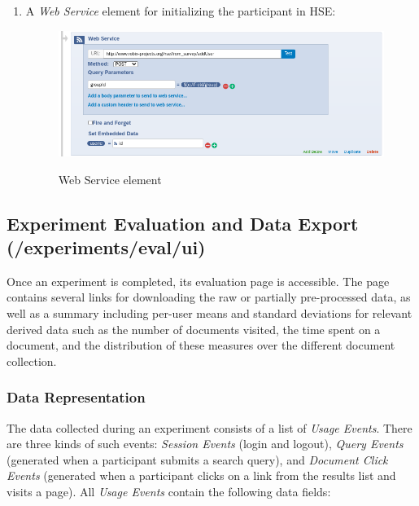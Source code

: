\documentclass[a4paper]{usiinfbachelorproject}
\begin{document}
\begin{appendices}
\begin{enumerate}
        \item
            A \emph{Web Service} element for initializing the participant in HSE:

            \begin{figure} [h]
            \centering
            \includegraphics[width=.9\textwidth]{figures/qflow5}
            \label{fig:qflow5} 
            \caption[]{Web Service element}
            \end{figure}

        \end{enumerate}

        \newpage


        \subsection{Experiment Evaluation and Data Export \small{(/experiments/eval/ui)}}

        Once an experiment is completed, its evaluation page is accessible. The page contains several links for downloading the raw or
        partially pre-processed data, as well as a summary including per-user means and standard deviations for relevant derived data such as
        the number of documents visited, the time spent on a document, and the distribution of these measures over the different
        document collection.

        \subsubsection{Data Representation}

        The data collected during an experiment consists of a list of \emph{Usage Events}. There are three kinds of such events:
        \emph{Session Events} (login and logout), \emph{Query Events} (generated when a participant submits a search query),
        and \emph{Document Click Events} (generated when a participant clicks on a link from the results list and visits a page).
        All \emph{Usage Events} contain the following data fields:


\end{appendices}
\end{document}
